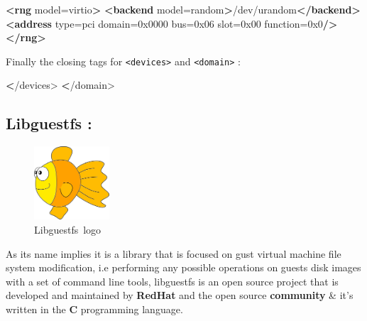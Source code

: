 \documentclass[
  14pt,
  english,
  a4paper,
]{scrreprt}
\newenvironment{Shaded}{}{}
\newcommand{\ErrorTok}[1]{\textcolor[rgb]{1.00,0.00,0.00}{\textbf{#1}}}
\newcommand{\KeywordTok}[1]{\textcolor[rgb]{0.00,0.44,0.13}{\textbf{#1}}}
\newcommand{\NormalTok}[1]{#1}
\newcommand{\OtherTok}[1]{\textcolor[rgb]{0.00,0.44,0.13}{#1}}
\newcommand{\StringTok}[1]{\textcolor[rgb]{0.25,0.44,0.63}{#1}}
\begin{document}
\begin{Shaded}
\begin{Highlighting}[]
\KeywordTok{\textless{}rng}\OtherTok{ model=}\StringTok{\textquotesingle{}virtio\textquotesingle{}}\KeywordTok{\textgreater{}}
  \KeywordTok{\textless{}backend}\OtherTok{ model=}\StringTok{\textquotesingle{}random\textquotesingle{}}\KeywordTok{\textgreater{}}\NormalTok{/dev/urandom}\KeywordTok{\textless{}/backend\textgreater{}}
  \KeywordTok{\textless{}address}\OtherTok{ type=}\StringTok{\textquotesingle{}pci\textquotesingle{}}\OtherTok{ domain=}\StringTok{\textquotesingle{}0x0000\textquotesingle{}}\OtherTok{ bus=}\StringTok{\textquotesingle{}0x06\textquotesingle{}}\OtherTok{ slot=}\StringTok{\textquotesingle{}0x00\textquotesingle{}}\OtherTok{ function=}\StringTok{\textquotesingle{}0x0\textquotesingle{}}\KeywordTok{/\textgreater{}}
\KeywordTok{\textless{}/rng\textgreater{}}
\end{Highlighting}
\end{Shaded}

Finally the closing tags for \texttt{\textless{}devices\textgreater{}}
and \texttt{\textless{}domain\textgreater{}} :

\begin{Shaded}
\begin{Highlighting}[]
  \ErrorTok{\textless{}}\NormalTok{/devices\textgreater{}}
\ErrorTok{\textless{}}\NormalTok{/domain\textgreater{}}
\end{Highlighting}
\end{Shaded}

\hypertarget{libguestfs}{%
\subsection{Libguestfs :}\label{libguestfs}}

\begin{figure}
\centering
\includegraphics[width=0.25\textwidth,height=\textheight]{figures/Libguestfs-logo.png}
\caption{Libguestfs~logo}
\end{figure}

As its name implies it is a library that is focused on gust virtual
machine file system modification, i.e performing any possible operations
on guests disk images with a set of command line tools, libguestfs is an
open source project that is developed and maintained by \textbf{RedHat}
and the open source \textbf{community} \& it's written in the \textbf{C}
programming language.
\end{document}
